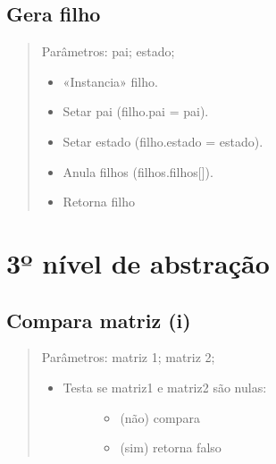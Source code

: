 \documentclass[letterpaper,10pt,openany,oneside,portuges]{sphinxmanual}
\begin{document}
\subsection{Gera filho}
\label{\detokenize{pseudo:gera-filho}}\begin{quote}

Parâmetros: pai; estado;
\begin{itemize}
\item {} 
«Instancia» filho.

\item {} 
Setar pai (filho.pai = pai).

\item {} 
Setar estado (filho.estado = estado).

\item {} 
Anula filhos (filhos.filhos{[}{]}).

\item {} 
Retorna filho

\end{itemize}
\end{quote}


\section{3º nível de abstração}
\label{\detokenize{pseudo:id1}}

\subsection{Compara matriz (i)}
\label{\detokenize{pseudo:compara-matriz-i}}\begin{quote}

Parâmetros: matriz 1; matriz 2;
\begin{itemize}
\item {} \begin{description}
\item[{Testa se matriz1 e matriz2 são nulas:}] \leavevmode\begin{itemize}
\item {} 
(não) compara

\item {} 
(sim) retorna falso

\end{itemize}

\end{description}

\end{itemize}
\end{quote}



\renewcommand{\indexname}{Índice}
\printindex
\end{document}
